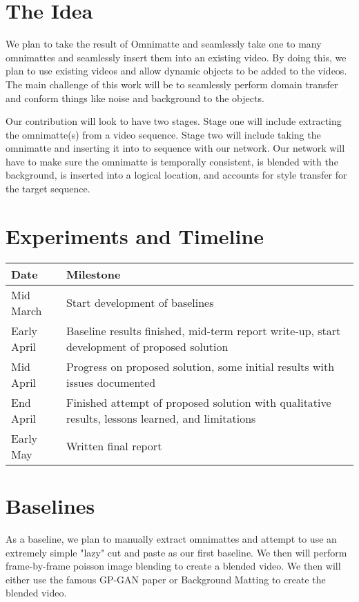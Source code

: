 \documentclass{article}
\begin{document}
\section{The Idea}
We plan to take the result of Omnimatte and seamlessly take one to many omnimattes and seamlessly insert them into an existing video. By doing this, we plan to use existing videos and allow dynamic objects to be added to the videos. The main challenge of this work will be to seamlessly perform domain transfer and conform things like noise and background to the objects.


Our contribution will look to have two stages. Stage one will include extracting the omnimatte(s) from a video sequence. Stage two will include taking the omnimatte and inserting it into to sequence with our network. Our network will have to make sure the omnimatte is temporally consistent, is blended with the background, is inserted into a logical location, and accounts for style transfer for the target sequence.

\section{Experiments and Timeline}
\begin{center}
\begin{tabular}{|| p{2cm} | p{12cm} ||}
    \hline
    \textbf{Date} & \textbf{Milestone} \\
    \hline
    Mid March & Start development of baselines \\
    \hline
    Early April & Baseline results finished, mid-term report write-up, start development of proposed solution \\
    \hline
    Mid April & Progress on proposed solution, some initial results with issues documented \\
    \hline
    End April & Finished attempt of proposed solution with qualitative results, lessons learned, and limitations\\
    \hline
    Early May & Written final report \\
    \hline
\end{tabular}
\end{center}

\section{Baselines}
As a baseline, we plan to manually extract omnimattes and attempt to use an extremely simple "lazy" cut and paste as our first baseline. We then will perform frame-by-frame poisson image blending to create a blended video. We then will either use the famous GP-GAN paper or Background Matting \cite{BMSengupta20} to create the blended video.


\printbibliography
\end{document}
